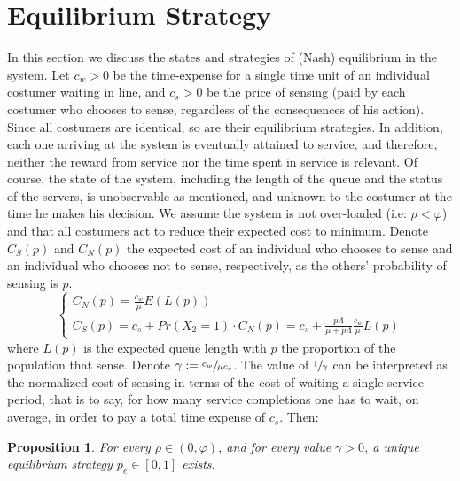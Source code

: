 \documentclass[11pt]{article}
\numberwithin{equation}{section}
\newtheorem{proposition}{Proposition}[section]
\begin{document}
\section{Equilibrium Strategy}
In this section we discuss the states and strategies of (Nash) equilibrium in the system. Let $c_{w}>0$ be the time-expense for a single time unit of an individual costumer waiting in line, and $c_{s}>0$ be the price of sensing (paid by each costumer who chooses to sense, regardless of the consequences of his action). Since all costumers are identical, so are their equilibrium strategies. In addition, each one arriving at the system is eventually attained to service, and therefore, neither the reward from service nor the time spent in service is relevant. Of course, the state of the system, including the length of the queue and the status of the servers, is unobservable as mentioned, and unknown to the costumer at the time he makes his decision. We assume the system is not over-loaded (i.e: $\rho<\varphi$) and that all costumers act to reduce their expected cost to minimum. Denote $C_{S}(p)$ and $C_{N}(p)$ the expected cost of an individual who chooses to sense and an individual who chooses not to sense, respectively, as the others' probability of sensing is $p$.
\begin{equation}\begin{cases}
 	C_{N}(p) = \frac{c_{w}}{\mu}E(L(p)) \\
	C_{S}(p) = c_{s} + Pr(X_2=1) \cdot C_{N}(p) = c_{s} + \frac{p\Lambda}{\mu+p\Lambda}\frac{c_{w}}{\mu}L(p) 
\end{cases}
\label{LossFunc}
\end{equation}
where $L(p)$ is the expected queue length with $p$ the proportion of the population that sense. Denote $\gamma :=\sfrac{c_{w}}{\mu c_{s}}$. The value of $\sfrac{1}{\gamma}$ can be interpreted as the normalized cost of sensing in terms of the cost of waiting a single service period, that is to say, for how many service completions one has to wait, on average, in order to pay a total time expense of $c_{s}$. Then:

\begin{proposition} For every $\rho\in(0,\varphi)$, and for every value  $\gamma>0$, a unique equilibrium strategy $p_{e}\in[0,1]$ exists.
\end{proposition}
\end{document}

